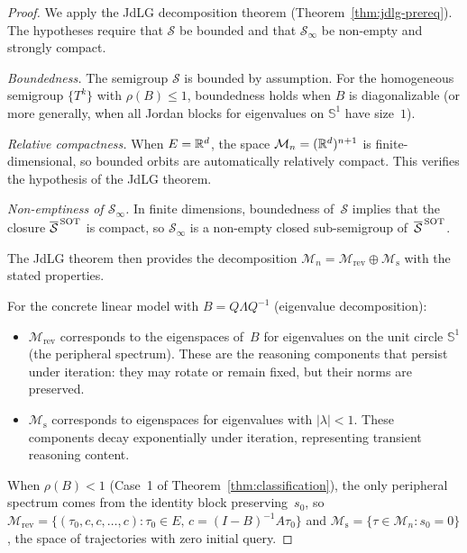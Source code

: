 \begin{proof}
  We apply the JdLG decomposition theorem (Theorem~\ref{thm:jdlg-prereq}).
  The hypotheses require that $\mathcal{S}$ be bounded and that
  $\mathcal{S}_\infty$ be non-empty and strongly compact.

  \emph{Boundedness.} The semigroup $\mathcal{S}$ is bounded by assumption.
  For the homogeneous semigroup $\{T^k\}$ with $\rho(B)\leq 1$, boundedness
  holds when $B$ is diagonalizable (or more generally, when all Jordan blocks
  for eigenvalues on $\mathbb{S}^1$ have size~$1$).

  \emph{Relative compactness.} When $E=\mathbb{R}^d$, the space $\mathcal{M}_n=
  (\mathbb{R}^d)^{n+1}$ is finite-dimensional, so bounded orbits are automatically
  relatively compact. This verifies the hypothesis of the JdLG theorem.

  \emph{Non-emptiness of $\mathcal{S}_\infty$.} In finite dimensions,
  boundedness of~$\mathcal{S}$ implies that the closure
  $\overline{\mathcal{S}}^{\,\operatorname{SOT}}$ is compact, so $\mathcal{S}_\infty$ is a
  non-empty closed sub-semigroup of~$\overline{\mathcal{S}}^{\,\operatorname{SOT}}$.

  The JdLG theorem then provides the decomposition
  $\mathcal{M}_n=\mathcal{M}_{\mathrm{rev}}\oplus\mathcal{M}_{\mathrm{s}}$
  with the stated properties.

  For the concrete linear model with $B=Q\Lambda Q^{-1}$ (eigenvalue
  decomposition):
  \begin{itemize}
    \item $\mathcal{M}_{\mathrm{rev}}$ corresponds to the eigenspaces of~$B$
      for eigenvalues on the unit circle $\mathbb{S}^1$ (the peripheral
      spectrum). These are the reasoning components that persist under
      iteration: they may rotate or remain fixed, but their norms are
      preserved.
    \item $\mathcal{M}_{\mathrm{s}}$ corresponds to eigenspaces for eigenvalues
      with $|\lambda|<1$. These components decay exponentially under
      iteration, representing transient reasoning content.
  \end{itemize}
  When $\rho(B)<1$ (Case~1 of Theorem~\ref{thm:classification}), the only
  peripheral spectrum comes from the identity block preserving~$s_0$, so
  $\mathcal{M}_{\mathrm{rev}}=\{(\tau_0,c,c,\dots,c):\tau_0\in E,\,
  c=(I-B)^{-1}A\tau_0\}$ and $\mathcal{M}_{\mathrm{s}}=\{\tau\in
  \mathcal{M}_n:s_0=0\}$, the space of trajectories with zero initial query.
\end{proof}

